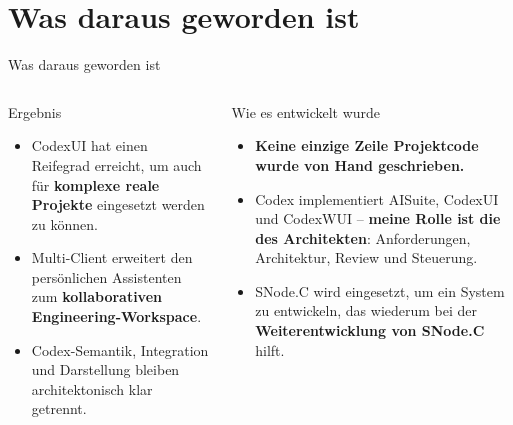 \documentclass[\fhformat,10pt]{fh-ooe}
\begin{document}
\section{Was daraus geworden ist}
\begin{frame}{Was daraus geworden ist}
\centering
{}
\vspace{0.3em}
\small
\begin{columns}[T]
\begin{block}{Ergebnis}
\begin{itemize}
  \item CodexUI hat einen Reifegrad erreicht, um auch für \textbf{komplexe reale Projekte} eingesetzt werden zu können.
  \item Multi-Client erweitert den persönlichen Assistenten zum \textbf{kollaborativen Engineering-Workspace}.
  \item Codex-Semantik, Integration und Darstellung bleiben architektonisch klar getrennt.
\end{itemize}
\end{block}
\begin{block}{Wie es entwickelt wurde}
\begin{itemize}
  \item \textbf{Keine einzige Zeile Projektcode wurde von Hand geschrieben.}
  \item Codex implementiert AISuite, CodexUI und CodexWUI -- \textbf{meine Rolle ist die des Architekten}: Anforderungen, Architektur, Review und Steuerung.
  \item SNode.C wird eingesetzt, um ein System zu entwickeln, das wiederum bei der \textbf{Weiterentwicklung von SNode.C} hilft.
\end{itemize}
\end{block}
\end{columns}
\end{frame}
\end{document}
